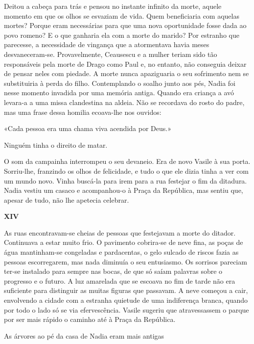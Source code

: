 Deitou a cabeça para trás e pensou no instante infinito da morte, aquele
momento em que os olhos se esvaziam de vida. Quem beneficiaria com
aquelas mortes? Porque eram necessárias para que uma nova oportunidade
fosse dada ao povo romeno? E o que ganharia ela com a morte do marido?
Por estranho que parecesse, a necessidade de vingança que a atormentava
havia meses desvaneceram-se. Provavelmente, Ceausescu e a mulher teriam
sido tão responsáveis pela morte de Drago como Paul e, no entanto, não
conseguia deixar de pensar neles com piedade. A morte nunca apaziguaria
o seu sofrimento nem se substituiria à perda do filho. Contemplando o
soalho junto aos pés, Nadia foi nesse momento invadida por uma memória
antiga. Quando era criança a avó levara-a a uma missa clandestina na
aldeia. Não se recordava do rosto do padre, mas uma frase dessa homilia
ecoava-lhe nos ouvidos:

«Cada pessoa era uma chama viva acendida por Deus.»

Ninguém tinha o direito de matar.

O som da campainha interrompeu o seu devaneio. Era de novo Vasile à sua
porta. Sorriu-lhe, franzindo os olhos de felicidade, e tudo o que ele
dizia tinha a ver com um mundo novo. Vinha buscá-la para irem para a rua
festejar o fim da ditadura. Nadia vestiu um casaco e acompanhou-o à
Praça da República, mas sentiu que, apesar de tudo, não lhe apetecia
celebrar.

\pagebreak
\vspace*{1.8cm}
\noindent{}\textbf{XIV}

\bigskip

As ruas encontravam-se cheias de pessoas que festejavam a morte do
ditador. Continuava a estar muito frio. O pavimento cobrira-se de neve
fina, as poças de água mantinham-se congeladas e pardacentas, o gelo
sulcado de riscos fazia as pessoas escorregarem, mas nada diminuía o seu
entusiasmo. Os sorrisos pareciam ter-se instalado para sempre nas bocas,
de que só saíam palavras sobre o progresso e o futuro. A luz amarelada
que se escoava no fim de tarde não era suficiente para distinguir as
muitas figuras que passavam. A neve começou a cair, envolvendo a cidade
com a estranha quietude de uma indiferença branca, quando por todo o
lado só se via efervescência. Vasile sugeriu que atravessassem o parque
por ser mais rápido o caminho até à Praça da República.

As árvores ao pé da casa de Nadia eram mais antigas


